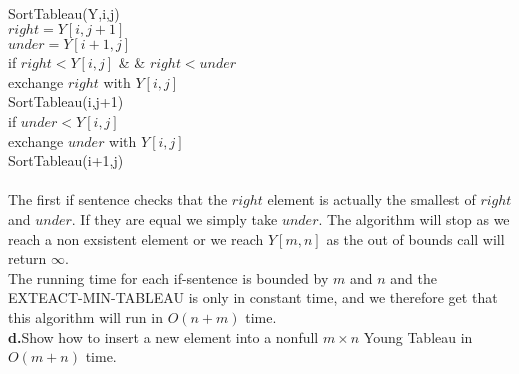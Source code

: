 \documentclass{article}
\theoremstyle{remark}
\numberwithin{equation}{section}
\begin{document}
\\
SortTableau(Y,i,j)\\
$right = Y[i,j+1]$\\
$under = Y[i+1,j]$\\
if $right < Y[i,j]$ \& \& \space $right < under$\\
\indent exchange $right$ with $Y[i,j]$\\
\indent SortTableau(i,j+1)\\
if $under < Y[i,j]$\\
exchange $under$ with $Y[i,j]$\\
\indent SortTableau(i+1,j)
\\
\\
The first if sentence checks that the $right$ element is actually the smallest of $right$ and $under$. If they are equal we simply take $under$. The algorithm will stop as we reach a non exsistent element or we reach $Y[m,n]$ as the out of bounds call will return $\infty$. \\
The running time for each if-sentence is bounded by $m$ and $n$ and the EXTEACT-MIN-TABLEAU is only in constant time, and we therefore get that this algorithm will run in $O(n+m)$ time. \\


\noindent\textbf{d.}Show how to insert a new element into a nonfull $m \times n$ Young Tableau in $O(m+n)$ time. \\
\end{document}
